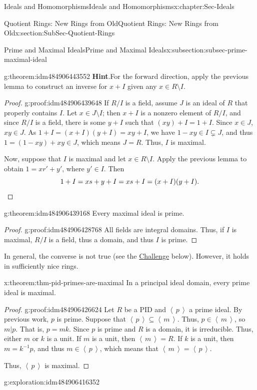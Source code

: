 \documentclass[oneside,10pt,]{book}
\newcommand{\blocktitlefont}{\relax}
\newcommand{\qedhere}{\relax}
\numberwithin{equation}{section}
\newcommand{\ideal}[1]{\left\langle\, #1 \,\right\rangle}
\begin{document}
\begin{chapterptx}{Ideals and Homomorphisms}{}{Ideals and Homomorphisms}{}{}{x:chapter:Sec-Ideals}
\begin{sectionptx}{Quotient Rings: New Rings from Old}{}{Quotient Rings: New Rings from Old}{}{}{x:section:SubSec-Quotient-Rings}
\begin{subsectionptx}{Prime and Maximal Ideals}{}{Prime and Maximal Ideals}{}{}{x:subsection:subsec-prime-maximal-ideal}
\begin{theorem}{}{}{g:theorem:idm484906443552}
\textbf{\blocktitlefont Hint}.\quad{}For the forward direction, apply the previous lemma to construct an inverse for \(x+I\) given any \(x\in R\setminus I\).%
\end{theorem}
\begin{proof}{}{g:proof:idm484906439648}
If \(R/I\) is a field, assume \(J\) is an ideal of \(R\) that properly contains \(I\). Let \(x\in J\setminus I\); then \(x+I\) is a nonzero element of \(R/I\), and since \(R/I\) is a field, there is some \(y+I\) such that \((xy)+I = 1+I\). Since \(x\in J\), \(xy\in J\). As \(1+I = (x+I)(y+I) = xy+I\), we have \(1-xy\in I\subsetneq J\), and thus \(1 = (1-xy)+xy \in J\), which means \(J = R\). Thus, \(I\) is maximal.%
\par
Now, suppose that \(I\) is maximal and let \(x\in R\setminus I\). Apply the previous lemma to obtain \(1 = xr' + y'\), where \(y'\in I\). Then%
\begin{equation*}
1 + I = xs+y + I = xs + I = (x+I)(y+I).\qedhere
\end{equation*}
%
\end{proof}
\begin{theorem}{}{}{g:theorem:idm484906439168}%
Every maximal ideal is prime.%
\end{theorem}
\begin{proof}{}{g:proof:idm484906428768}
All fields are integral domains. Thus, if \(I\) is maximal, \(R/I\) is a field, thus a domain, and thus \(I\) is prime.%
\end{proof}
In general, the converse is not true (see the \hyperref[x:assemblage:challenge-nonmaximal-prime]{Challenge} below). However, it holds in sufficiently nice rings.%
\begin{theorem}{}{}{x:theorem:thm-pid-primes-are-maximal}%
In a principal ideal domain, every prime ideal is maximal.%
\end{theorem}
\begin{proof}{}{g:proof:idm484906426624}
Let \(R\) be a PID and \(\ideal{p}\) a prime ideal. By previous work, \(p\) is prime. Suppose that \(\ideal{p} \subseteq \ideal{m}\). Thus, \(p\in \ideal{m}\), so \(m|p\). That is, \(p = mk\). Since \(p\) is prime and \(R\) is a domain, it is irreducible. Thus, either \(m\) or \(k\) is a unit. If \(m\) is a unit, then \(\ideal{m} = R\). If \(k\) is a unit, then \(m = k^{-1} p\), and thus \(m\in \ideal{p}\), which means that \(\ideal{m} = \ideal{p}\).%
\par
Thus, \(\ideal{p}\) is maximal.%
\end{proof}
\begin{exploration}{}{g:exploration:idm484906416352}%

\end{exploration}
\end{subsectionptx}
\end{sectionptx}
\end{chapterptx}
\end{document}
